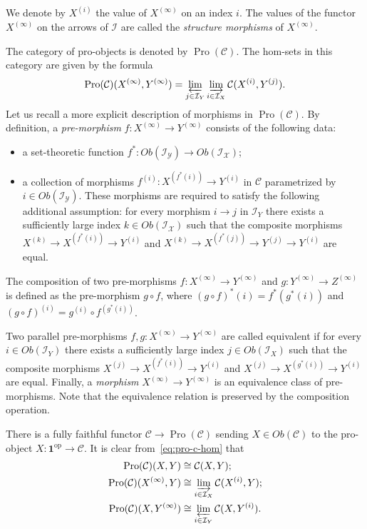 \documentclass[oneside, 11pt]{amsart}
\numberwithin{equation}{section}
\theoremstyle{definition}
\theoremstyle{remark}
\DeclareMathOperator{\Pro}{Pro}
\newcommand{\op}{\mathrm{op}}
\begin{document}
We denote by \(X^{(i)}\) the value of \(X^{(\infty)}\) on an index \(i\).
The values of the functor $X^{(\infty)}$ on the arrows of $\mathcal{I}$ are called the {\it structure morphisms} of $X^{(\infty)}$.

The category of pro-objects is denoted by \(\Pro(\mathcal C)\). The hom-sets in this category are given by the formula
\begin{equation} \label{eq:pro-c-hom} \Pro(\mathcal C)(X^{(\infty)}, Y^{(\infty)}) = \varprojlim_{j \in \mathcal I_Y} \varinjlim_{i \in \mathcal I_X} \mathcal C(X^{(i)}, Y^{(j)}). \end{equation}
Let us recall a more explicit description of morphisms in \(\Pro(\mathcal C)\). 
By definition, a {\it pre-morphism} \(f \colon X^{(\infty)} \to Y^{(\infty)}\) consists of the following data:
\begin{itemize}
\item a set-theoretic function \(f^* \colon Ob(\mathcal{I_Y}) \to Ob(\mathcal{I_X})\);
\item a collection of morphisms \(f^{(i)} \colon X^{(f^*(i))} \to Y^{(i)}\) in $\mathcal{C}$ parametrized by $i \in Ob(\mathcal{I_Y})$. These morphisms are required to satisfy the following additional assumption: for every morphism \(i \to j\) in \(\mathcal I_Y\) there exists a sufficiently large index \(k \in Ob(\mathcal{I_X})\) such that the composite morphisms \(X^{(k)} \to X^{(f^*(i))} \to Y^{(i)}\) and \(X^{(k)} \to X^{(f^*(j))} \to Y^{(j)} \to Y^{(i)}\) are equal. \end{itemize}
The composition of two pre-morphisms \(f \colon X^{(\infty)} \to Y^{(\infty)}\) and \(g \colon Y^{(\infty)} \to Z^{(\infty)}\) is defined as the pre-morphism \(g \circ f\), where \((g \circ f)^*(i) = f^*(g^*(i))\) and \((g \circ f)^{(i)} = g^{(i)} \circ f^{(g^*(i))}\).

Two parallel pre-morphisms \(f, g \colon X^{(\infty)} \to Y^{(\infty)}\) are called equivalent if for every \(i \in Ob(\mathcal I_Y)\) there exists a sufficiently large index \(j \in Ob(\mathcal I_X)\) such that the composite morphisms \(X^{(j)} \to X^{(f^*(i))} \to Y^{(i)}\) and \(X^{(j)} \to X^{(g^*(i))} \to Y^{(i)}\) are equal. Finally, a {\it morphism} \(X^{(\infty)} \to Y^{(\infty)}\) is an equivalence class of pre-morphisms. Note that the equivalence relation is preserved by the composition operation.

There is a fully faithful functor $\mathcal{C} \to \Pro(\mathcal{C})$ sending \(X \in Ob(\mathcal C)\) to the pro-object $X \colon \mathbf{1}^\op \to \mathcal{C}$. It is clear from~\eqref{eq:pro-c-hom}  that
\begin{align}
 \Pro(\mathcal C)(X, Y) &\cong \mathcal C(X, Y);\\
 \Pro(\mathcal C)(X^{(\infty)}, Y) &\cong \varinjlim_{i \in \mathcal I_X} \mathcal C(X^{(i)}, Y); \label{eq:pro-c-hom-2}\\
 \Pro(\mathcal C)(X, Y^{(\infty)}) &\cong \varprojlim_{i \in \mathcal I_Y} \mathcal C(X, Y^{(i)}).
\end{align}
\end{document}

